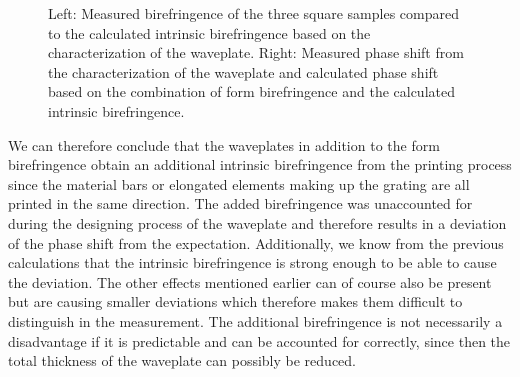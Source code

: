 \begin{figure}[H]
    \centering
    
    \caption{Left: Measured birefringence of the three square samples compared to the calculated intrinsic birefringence based on the characterization of the waveplate. Right: Measured phase shift from the characterization of the waveplate and calculated phase shift based on the combination of form birefringence and the calculated intrinsic birefringence.}
    \label{fig:FullPlatesWcalc}
\end{figure}

We can therefore conclude that the waveplates in addition to the form birefringence obtain an additional intrinsic birefringence from the printing process since the material bars or elongated elements making up the grating are all printed in the same direction. The added birefringence was unaccounted for during the designing process of the waveplate and therefore results in a deviation of the phase shift from the expectation. Additionally, we know from the previous calculations that the intrinsic birefringence is strong enough to be able to cause the deviation. The other effects mentioned earlier can of course also be present but are causing smaller deviations which therefore makes them difficult to distinguish in the measurement. The additional birefringence is not necessarily a disadvantage if it is predictable and can be accounted for correctly, since then the total thickness of the waveplate can possibly be reduced. 


